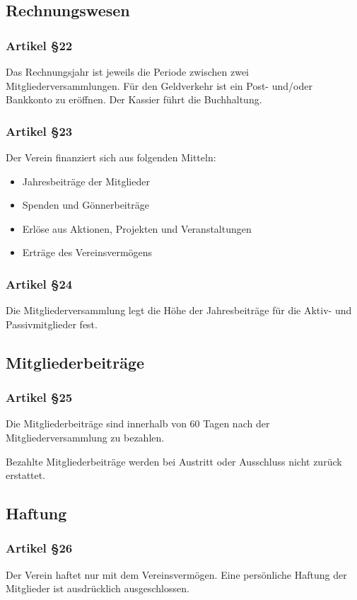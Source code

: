 \documentclass[a4paper,
               10pt,
               fleqn]{article}
\begin{document}
\subsection{Rechnungswesen}

\subsubsection*{Artikel §22}
Das Rechnungsjahr ist jeweils die Periode zwischen zwei Mitgliederversammlungen. Für
den Geldverkehr ist ein Post- und/oder Bankkonto zu
eröffnen. Der Kassier führt die Buchhaltung.

\subsubsection*{Artikel §23}
Der Verein finanziert sich aus folgenden Mitteln:
\begin{itemize}
\item Jahresbeiträge der Mitglieder
\item Spenden und Gönnerbeiträge
\item Erlöse aus Aktionen, Projekten und Veranstaltungen
\item Erträge des Vereinsvermögens
\end{itemize}
 
\subsubsection*{Artikel §24}
Die Mitgliederversammlung legt die Höhe der Jahresbeiträge 
für die Aktiv- und Passivmitglieder fest.

\subsection{Mitgliederbeiträge}

\subsubsection*{Artikel §25}
Die Mitgliederbeiträge sind innerhalb von 60 Tagen nach der 
Mitgliederversammlung zu bezahlen.

Bezahlte Mitgliederbeiträge werden bei Austritt oder 
Ausschluss nicht zurück erstattet.

\subsection{Haftung}

\subsubsection*{Artikel §26}
Der Verein haftet nur mit dem Vereinsvermögen. Eine
persönliche Haftung der Mitglieder ist ausdrücklich
ausgeschlossen.
\end{document}
